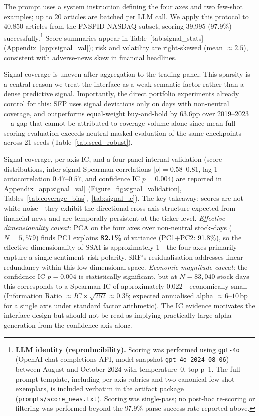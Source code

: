 \documentclass{article}
\begin{document}
The prompt uses a system instruction defining the four axes and
two few-shot examples; up to 20 articles are batched per LLM call.
We apply this protocol to 40,850 articles from the FNSPID NASDAQ subset,
scoring 39,995 (97.9\%) successfully.\footnote{\textbf{LLM identity (reproducibility).}
Scoring was performed using \texttt{gpt-4o} (OpenAI chat-completions API, model snapshot \texttt{gpt-4o-2024-08-06}) between August and October 2024 with temperature~0, top-p~1.
The full prompt template, including per-axis rubrics and two canonical few-shot exemplars, is included verbatim in the artifact package (\texttt{prompts/score\_news.txt}).
Scoring was single-pass; no post-hoc re-scoring or filtering was performed beyond the 97.9\% parse success rate reported above.}
Score summaries appear in Table~\ref{tab:signal_stats} (Appendix~\ref{app:signal_val}); risk and volatility are right-skewed (mean $\approx 2.5$), consistent with adverse-news skew in financial headlines.

Signal coverage is uneven after aggregation to the trading panel:
This sparsity is a central reason we treat the interface as a weak semantic factor rather than a dense predictive signal.
Importantly, the direct portfolio experiments already control for this: SFP uses signal deviations only on days with non-neutral coverage, and outperforms equal-weight buy-and-hold by 63.6pp over 2019--2023---a gap that cannot be attributed to coverage volume alone since mean full-scoring evaluation exceeds neutral-masked evaluation of the same checkpoints across 21 seeds (Table~\ref{tab:seed_robust}).

Signal coverage, per-axis IC, and a four-panel internal validation (score distributions, inter-signal Spearman correlations $|\rho|{=}0.58$--$0.81$, lag-1 autocorrelation $0.47$--$0.57$, and confidence IC $p{=}0.004$) are reported in Appendix~\ref{app:signal_val} (Figure~\ref{fig:signal_validation}, Tables~\ref{tab:coverage_bias},~\ref{tab:signal_ic}).
The key takeaway: scores are not white noise---they exhibit the directional cross-axis structure expected from financial news and are temporally persistent at the ticker level.
\emph{Effective dimensionality caveat:} PCA on the four axes over non-neutral stock-days ($N{=}5{,}579$) finds PC1 explains \textbf{82.1\%} of variance (PC1+PC2: 91.8\%), so the effective dimensionality of SSAI is approximately 1---the four axes primarily capture a single sentiment--risk polarity. SRF's residualisation addresses linear redundancy within this low-dimensional space.
\emph{Economic magnitude caveat:} the confidence IC $p{=}0.004$ is statistically significant, but at $N{=}83{,}040$ stock-days this corresponds to a Spearman IC of approximately $0.022$---economically small (Information Ratio $\approx IC\times\sqrt{252}\approx 0.35$; expected annualised alpha $\approx 6$--$10$\,bp for a single axis under standard factor arithmetic). The IC evidence motivates the interface design but should not be read as implying practically large alpha generation from the confidence axis alone.
\end{document}
